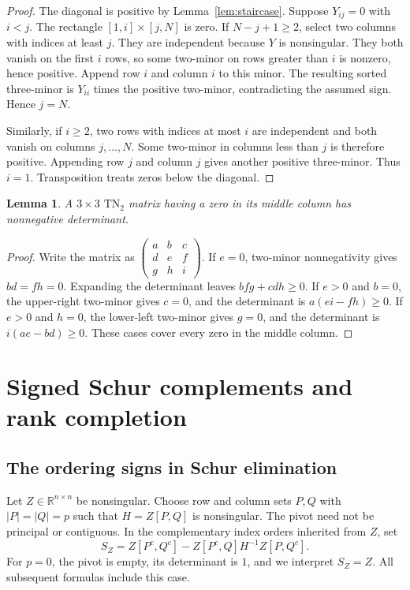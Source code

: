 \documentclass[11pt]{article}
\newtheorem{lemma}[theorem]{Lemma}
\theoremstyle{definition}
\theoremstyle{remark}
\numberwithin{equation}{section}
\newcommand{\R}{\mathbb R}
\begin{document}
\begin{proof}
The diagonal is positive by Lemma~\ref{lem:staircase}.
Suppose $Y_{ij}=0$ with $i<j$. The rectangle
$[1,i]\times[j,N]$ is zero. If $N-j+1\geq2$, select two columns
with indices at least $j$. They are independent because $Y$ is
nonsingular. They both vanish on the first $i$ rows, so some
two-minor on rows greater than $i$ is nonzero, hence positive.
Append row $i$ and column $i$ to this minor. The resulting sorted
three-minor is $Y_{ii}$ times the positive two-minor, contradicting
the assumed sign. Hence $j=N$.

Similarly, if $i\geq2$, two rows with indices at most $i$ are
independent and both vanish on columns $j,\ldots,N$. Some two-minor
in columns less than $j$ is therefore positive. Appending row $j$
and column $j$ gives another positive three-minor. Thus $i=1$.
Transposition treats zeros below the diagonal.
\end{proof}

\begin{lemma}\label{lem:middle}
A $3\times3$ $\mathrm{TN}_2$ matrix having a zero in its middle
column has nonnegative determinant.
\end{lemma}

\begin{proof}
Write the matrix as
$\left(\begin{smallmatrix}a&b&c\\d&e&f\\g&h&i\end{smallmatrix}\right)$.
If $e=0$, two-minor nonnegativity gives $bd=fh=0$. Expanding the
determinant leaves $bfg+cdh\geq0$. If $e>0$ and $b=0$, the
upper-right two-minor gives $c=0$, and the determinant is
$a(ei-fh)\geq0$. If $e>0$ and $h=0$, the lower-left two-minor
gives $g=0$, and the determinant is $i(ae-bd)\geq0$. These cases
cover every zero in the middle column.
\end{proof}

\section{Signed Schur complements and rank completion}\label{sec:schur}

\subsection{The ordering signs in Schur elimination}

Let $Z\in\R^{n\times n}$ be nonsingular. Choose row and column
sets $P,Q$ with $|P|=|Q|=p$ such that $H=Z[P,Q]$ is
nonsingular. The pivot need not be principal or contiguous.
In the complementary index orders inherited from $Z$, set
\begin{equation}\label{eq:schur}
 S_Z=Z[P^c,Q^c]-Z[P^c,Q]H^{-1}Z[P,Q^c].
\end{equation}
For $p=0$, the pivot is empty, its determinant is $1$, and we
interpret $S_Z=Z$. All subsequent formulas include this case.
\end{document}
